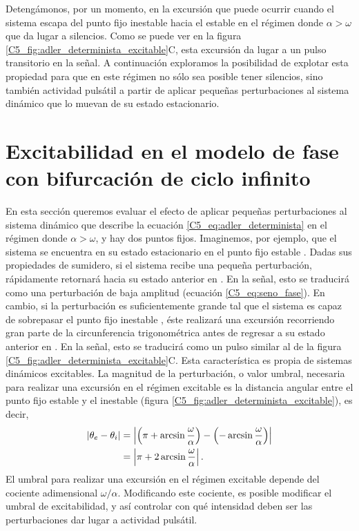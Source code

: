 \documentclass[./main.tex]{subfiles}
\begin{document}
Detengámonos, por un momento, en la excursión que puede ocurrir cuando el sistema escapa del punto fijo inestable hacia el estable en el régimen donde $\alpha > \omega$ que da lugar a silencios. Como se puede ver en la figura  \ref{C5_fig:adler_determinista_excitable}C, esta excursión da lugar a un pulso transitorio en la señal. A continuación exploramos la posibilidad de explotar esta propiedad para que en este régimen no sólo sea posible tener silencios, sino también actividad pulsátil a partir de aplicar pequeñas perturbaciones al sistema dinámico que lo muevan de su estado estacionario. 


\section{Excitabilidad en el modelo de fase con bifurcación de ciclo infinito}
\label{C5_sec:perturbacion}

En esta sección queremos evaluar el efecto de aplicar pequeñas perturbaciones al sistema dinámico que describe la ecuación \ref{C5_eq:adler_determinista} en el régimen donde $\alpha > \omega$, y  hay dos puntos fijos. Imaginemos, por ejemplo, que el sistema se encuentra en su estado estacionario en el punto fijo estable \xxe. Dadas sus propiedades de sumidero, si el sistema recibe una pequeña perturbación, rápidamente retornará hacia su estado anterior en \xxe. En la señal, esto se traducirá como una perturbación de baja amplitud (ecuación \ref{C5_eq:seno_fase}). En cambio, si la perturbación es suficientemente grande tal que el sistema es capaz de sobrepasar el punto fijo inestable \xxi, éste realizará una excursión recorriendo gran parte de la circunferencia trigonométrica antes de regresar a su estado anterior en \xxe. En la señal, esto se traducirá como un pulso similar al de la figura \ref{C5_fig:adler_determinista_excitable}C. Esta característica es propia de sistemas dinámicos excitables. La magnitud de la perturbación, o valor umbral, necesaria para realizar una excursión en el régimen excitable es la distancia angular entre el punto fijo estable y el inestable (figura \ref{C5_fig:adler_determinista_excitable}), es decir,
\begin{align}
    \left| \theta_e - \theta_i \right| &=  \left| \left(\pi + \arcsin{\frac{\omega}{\alpha}} \right) -  \left(-\arcsin{\frac{\omega}{\alpha}}\right)\right| \\
    &=  \left|\pi + 2 \arcsin{\frac{\omega}{\alpha}}\right|.
    \label{C5_eq:umbral}
\end{align} 
El umbral para realizar una excursión en el régimen excitable depende del cociente adimensional $\omega/\alpha$. Modificando este cociente, es posible modificar el umbral de excitabilidad, y así controlar con qué intensidad deben ser las perturbaciones dar lugar a actividad pulsátil.
\end{document}
